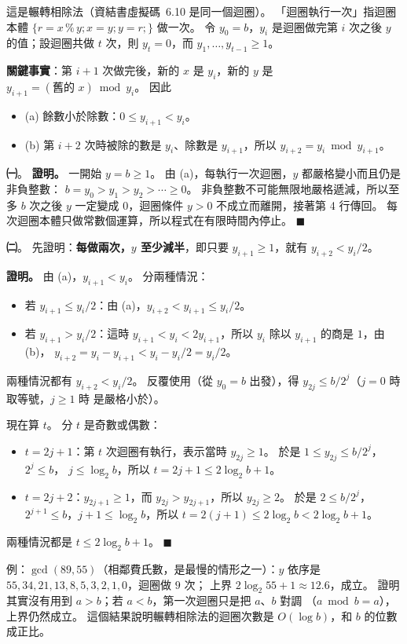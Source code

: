 \begin{pastsoln}
這是輾轉相除法（資結書虛擬碼~6.10 是同一個迴圈）。 「迴圈執行一次」指迴圈本體 $\{r = x \mathbin{\%} y; x = y; y = r;\}$ 做一次。
令 $y_0 = b$，$y_i$ 是迴圈做完第 $i$ 次之後 $y$ 的值；設迴圈共做 $t$ 次，則 $y_t = 0$，而 $y_1, \ldots, y_{t-1} \ge 1$。

\textbf{關鍵事實}：第 $i + 1$ 次做完後，新的 $x$ 是 $y_i$，新的 $y$ 是 $y_{i+1} = (\text{舊的 } x) \bmod y_i$。 因此
\begin{itemize}
\item (a) 餘數小於除數：$0 \le y_{i+1} < y_i$。
\item (b) 第 $i + 2$ 次時被除的數是 $y_i$、除數是 $y_{i+1}$，所以 $y_{i+2} = y_i \bmod y_{i+1}$。
\end{itemize}

\textbf{㈠}。 \textbf{證明。} 一開始 $y = b \ge 1$。 由 (a)，每執行一次迴圈，$y$ 都嚴格變小而且仍是非負整數：
$b = y_0 > y_1 > y_2 > \cdots \ge 0$。 非負整數不可能無限地嚴格遞減，所以至多 $b$ 次之後 $y$ 一定變成 $0$，迴圈條件
$y > 0$ 不成立而離開，接著第 4 行傳回。 每次迴圈本體只做常數個運算，所以程式在有限時間內停止。 \hfill$\blacksquare$

\textbf{㈡}。 先證明：\textbf{每做兩次，$y$ 至少減半}，即只要 $y_{i+1} \ge 1$，就有 $y_{i+2} < y_i / 2$。

\textbf{證明。} 由 (a)，$y_{i+1} < y_i$。 分兩種情況：
\begin{itemize}
\item 若 $y_{i+1} \le y_i / 2$：由 (a)，$y_{i+2} < y_{i+1} \le y_i / 2$。
\item 若 $y_{i+1} > y_i / 2$：這時 $y_{i+1} < y_i < 2y_{i+1}$，所以 $y_i$ 除以 $y_{i+1}$ 的商是 $1$，由 (b)，
$y_{i+2} = y_i - y_{i+1} < y_i - y_i/2 = y_i / 2$。
\end{itemize}
兩種情況都有 $y_{i+2} < y_i / 2$。 反覆使用（從 $y_0 = b$ 出發），得 $y_{2j} \le b / 2^{j}$（$j = 0$ 時取等號，$j \ge 1$ 時
是嚴格小於）。

現在算 $t$。 分 $t$ 是奇數或偶數：
\begin{itemize}
\item $t = 2j + 1$：第 $t$ 次迴圈有執行，表示當時 $y_{2j} \ge 1$。 於是 $1 \le y_{2j} \le b / 2^j$，$2^j \le b$，
$j \le \log_2 b$，所以 $t = 2j + 1 \le 2\log_2 b + 1$。
\item $t = 2j + 2$：$y_{2j+1} \ge 1$，而 $y_{2j} > y_{2j+1}$，所以 $y_{2j} \ge 2$。 於是 $2 \le b / 2^j$，
$2^{j+1} \le b$，$j + 1 \le \log_2 b$，所以 $t = 2(j+1) \le 2\log_2 b < 2\log_2 b + 1$。
\end{itemize}
兩種情況都是 $t \le 2\log_2 b + 1$。 \hfill$\blacksquare$

例：$\gcd(89, 55)$（相鄰費氏數，是最慢的情形之一）：$y$ 依序是 $55, 34, 21, 13, 8, 5, 3, 2, 1, 0$，迴圈做 $9$ 次；
上界 $2\log_2 55 + 1 \approx 12.6$，成立。 證明其實沒有用到 $a > b$；若 $a < b$，第一次迴圈只是把 $a$、$b$ 對調
（$a \bmod b = a$），上界仍然成立。 這個結果說明輾轉相除法的迴圈次數是 $O(\log b)$，和 $b$ 的位數成正比。
\end{pastsoln}
